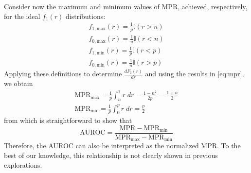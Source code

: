 Consider now the maximum and minimum values of MPR, achieved, respectively, for the ideal $f_1(r)$ distributions:
%
\begin{gather}
    f_{1, \text{max}}(r) = \frac{1}{p}\mathbb{I}(r > n)\\
    f_{0, \text{max}}(r) = \frac{1}{n}\mathbb{I}(r < n)\\
    f_{1, \text{min}}(r) = \frac{1}{p}\mathbb{I}(r < p)\\
    f_{0, \text{min}}(r) = \frac{1}{n}\mathbb{I}(r > p)
\end{gather}
%
Applying these definitions to determine $\frac{dF_1(r)}{dr}$ and using the results in \autoref{eq:mpr}, we obtain
%
%
%
%
%
\begin{gather}
    \text{MPR}_\text{max}
        = \frac{1}{p} \int_n^1 r\;dr
        = \frac{1 - n^2}{2p}
        = \frac{1 + n}{2}
    \\
    \text{MPR}_\text{min} = \frac{1}{p} \int_0^p r\;dr = \frac{p}{2}
\end{gather}
%
from which is straightforward to show that
%
\begin{equation}
    \text{AUROC}
        = \frac{
            \text{MPR} - \text{MPR}_\text{min}
        }{
            \text{MPR}_\text{max} - \text{MPR}_\text{min}
        }
\end{equation}
%
Therefore, the AUROC can also be interpreted as the normalized MPR.
To the best of our knowledge, this relationship is not clearly shown in previous explorations.  %

